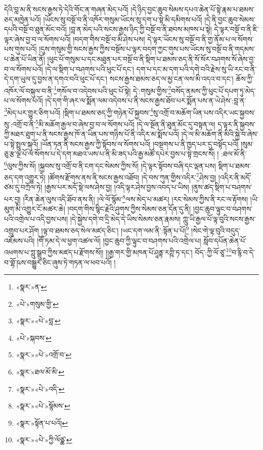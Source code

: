 དེའི་བླ་མ་ནི་སངས་རྒྱས་ཏེ་དེའི་གོང་ན་གཞན་མེད་པའོ། །དེ་ཉིད་བྱང་ཆུབ་སེམས་དཔའ་ཆེན་པོ་སྟེ་རྣམ་པ་ཐམས་ཅད་མཁྱེན་པའོ། །ཡོངས་སུ་བསྔོ་བ་ནི་འཁོར་གསུམ་ཡོངས་སུ་དག་པ་སྟེ་མི་དམིགས་པའོ། །དེ་ནི་བྱང་ཆུབ་སེམས་དཔའི་བསྔོ་བ་ཐུན་མོང་བའོ། །བླ་ན་མེད་པའི་སངས་རྒྱས་ཉིད་ཀྱི་བསྔོ་བ་ནི་ཐབས་མཁས་པ་སྟེ། དེ་ལྟར་བསྔོ་བ་ནི་ཇི་ལྟར་ཞེས་བྱ་བ་ལ་སོགས་པའོ། །བདག་གིས་བསྔོ་བ་མི་ཤེས་པས། དེ་ལྟར་ཡོངས་སུ་བསྔོ་བ་ནི་གྱ་ནོམ་པ་ལ་སོགས་པས་གུས་པའོ། །དུས་གསུམ་གྱི་སངས་རྒྱས་ཀྱིས་བསྔོས་པ་ལྟར་བདག་ཀྱང་གུས་པས་ཡོངས་སུ་བསྔོ་བ་ནི་གདམས་པ་ཆེན་པོ་ཡིན་ནོ། །ཕུང་པོ་གསུམ་པ་དང་མཐུན་པར་བསྔོ་བ་ནི་སྡིག་པ་ཐམས་ཅད་ནི་སོ་སོར་བཤགས་སོ་ཞེས་བྱ་བ་ལ་སོགས་པའོ། །དེ་ལ་སྡིག་པ་བཤགས་པའི་ཕུང་པོ་དང་། དག་པ་དང་མ་དག་པའི་དགེ་བའི་རྗེས་སུ་ཡི་རང་བ་ནི་དེ་དག་ཡུལ་དུ་བྱས་ན་དགའ་བའི་ཕུང་པོ་དང་། སངས་རྒྱས་ཐམས་ཅད་ལ་མྱ་ངན་ལས་མི་འདའ་བ་དང་། ཆོས་ཀྱི་འཁོར་ལོ་བསྐུལ་བ་ནི་\footnote{«སྣར་»ན་}གསོལ་བ་འདེབས་པའི་ཕུང་པོ་སྟེ། དེ་:གསུམ་གྱིས་\footnote{«པེ་»གསུམ་གྱི་}བསོད་ནམས་ཀྱི་ཕུང་པོ་དཔག་ཏུ་མེད་པ་ལ་སོགས་པའོ། །དེ་དག་གི་ཞར་ལ་སྨོན་ལམ་འདེབས་པ་ནི་སངས་རྒྱས་ཐོབ་པར་སྨོན་པས་ན་ཡེ་ཤེས་:བླ་ན་\footnote{«སྣར་»«པེ་»བླ་}མེད་པར་གྱུར་ཅིག་པའོ། །སྡིག་པ་ཐམས་ཅད་ཀྱི་གཉེན་པོ་སྐྱབས་\footnote{«པེ་»སྐབས་}སུ་འགྲོ་བ་མཆོག་ཡིན་པས་འདིར་ཡང་སྐྱབས་སུ་:འགྲོ་བ་ནི་\footnote{«སྣར་»«པེ་»འགྲོ་བ་}མི་མཆོག་རྒྱལ་བ་ཞེས་བྱ་བ་ལ་སོགས་པའོ། །དེ་ལ་སྔོན་ནི་ཐུན་མོང་དུ་བསྟན་ལ། ད་ལྟར་ནི་སྐྱབས་ཀྱི་མཐར་ཐུག་པ་ནི་སངས་རྒྱས་ཁོ་ན་ཡིན་པས་གཉིས་པོ་ནི་འདིར་མ་སྨོས་པའོ། །དེ་ལ་མི་མཆོག་ནི་མིའི་སྐྱེ་བ་ཞེས་པ་སྟེ་སྤྲུལ་སྐུའོ། །ཡོན་ཏན་ནི་སངས་རྒྱས་ཀྱི་སྟོབས་ལ་སོགས་པའོ། །བསྔགས་པ་ནི་ཁྱད་པར་དུ་བསྟོད་པའོ། །སུམ་ཅུ་རྩ་ལྔ་པོ་ལ་སོགས་པ་དེ་དག་མཐའ་ཡས་པ་ནི་མི་ཟད་པའི་རྒྱ་མཚོ་དཔེར་བྱས་པ་སྟེ་གྲངས་སོ། །
:ཐལ་མོ་ནི་\footnote{«སྣར་»ཐལ་མོ་མི་}ལུས་ཀྱིས་སོ། །སྐྱབས་སུ་འགྲོ་བ་ནི་ངག་དང་སེམས་ཀྱིས་སོ། །དེ་ལྟར་སྟོབས་བཞི་དང་ལྡན་པས། སྡིག་པ་ཐམས་ཅད་དག་འགྱུར་ཏེ། །ཚོགས་རྫོགས་ནས་ནི་སངས་རྒྱས་འཐོབ། །དེ་བས་ཀུན་གྱིས་འདིར་\footnote{«སྣར་»«པེ་»འདི་}ཤེས་བྱ། །འདིར་ནི་མདོ་ཙམ་དུ་བཀྲོལ་ཏེ། །རྒྱས་པར་མདོ་སྡེ་ལས་ཤེས་བྱ། །འདི་ལྟར་ཤེས་བྱས་འབད་པ་ཡིས། །ནུས་ཚད་སྡིག་པ་བཤགས་པར་བྱ། །རིན་ཆེན་ལུས་འདི་ཐོབ་ནས་ནི། །ལེ་ལོ་སྙོམ་\footnote{«སྣར་»«པེ་»སྙོམས་}ལས་མེད་པ་མཚར། །རང་སེམས་ཀྱིས་ནི་རང་ལ་རྟོགས། །ཡི་མུག་མི་འགྱུར་ངོ་མཚར་ཆེ། །བདག་གིས་སྙིང་རྗེའི་ཤུགས་ཀྱིས་སེམས་ཅན་དོན་དུ་ནི། །བྱང་ཆུབ་ལྟུང་བ་བཤགས་པའི་འགྲེལ་པ་འདི་བྱས་པས། །དེ་སྐྱེས་དགེ་བ་དྲི་མེད་དེ་ཡིས་སེམས་ཅན་རྣམས། ཀླུ་ཡི་རྒྱལ་པོ་ལྟ་བུའི་སངས་རྒྱས་འགྲུབ་པར་ཤོག །ལྟ་བ་ཐམས་ཅད་སེལ་མཛད་ཅིང་། །ཡང་དག་ལམ་ནི་:སྟོན་པ་པོ།\footnote{«སྣར་»སྟོན་པ་པའོ།} །སེང་གེ་ལྟ་བུའི་བདུད་འཇོམས་པའི། །གཽ་ཏམ་དེ་ལ་ཕྱག་འཚལ་ལོ། །བྱང་ཆུབ་ཀྱི་ལྟུང་བ་བཤགས་པའི་འགྲེལ་པ། སློབ་དཔོན་ཆེན་པོ་འཕགས་པ་ཀླུ་སྒྲུབ་ཀྱིས་མཛད་པ་རྫོགས་སོ།། །།རྒྱ་གར་གྱི་མཁན་པོ་ཤཱནྟ་རཀྵི་ཏ་དང་། བོད་:ཀྱི་ལོ་ཙཱ་\footnote{«སྣར་»«པེ་»ཀྱི་ལོཙྪ་}བ་རྙི་བ་དེ་བ་གྷོ་ཥས་བསྒྱུར་ཅིང་ཞུས་ཏེ་གཏན་ལ་ཕབ་པའོ། །
